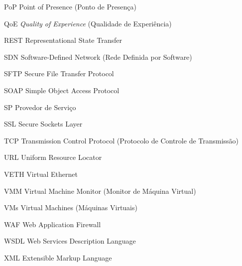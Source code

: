 \begin{siglas}
\item[PoP] Point of Presence (Ponto de Presença) 
\item[QoE] \textit{Quality of Experience} (Qualidade de Experiência) 
\item[REST] Representational State Transfer 
\item[SDN] Software-Defined Network (Rede Definida por Software) 
\item[SFTP] Secure File Transfer Protocol 
\item[SOAP] Simple Object Access Protocol 
\item[SP] Provedor de Serviço 
\item[SSL] Secure Sockets Layer 
\item[TCP] Transmission Control Protocol (Protocolo de Controle de Transmissão) 
\item[URL] Uniform Resource Locator 
\item[VETH] Virtual Ethernet 
\item[VMM] Virtual Machine Monitor (Monitor de Máquina Virtual) 
\item[VMs] Virtual Machines (Máquinas Virtuais) 
\item[WAF] Web Application Firewall 
\item[WSDL] Web Services Description Language 
\item[XML] Extensible Markup Language
\end{siglas}




